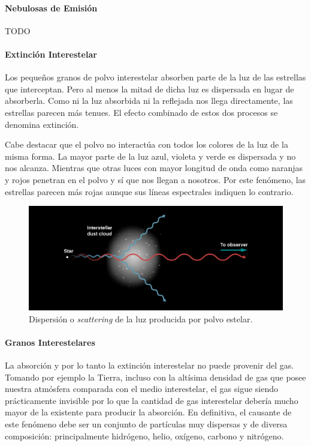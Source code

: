 \documentclass{tufte-handout}
\begin{document}
\paragraph{Nebulosas de Emisión}

TODO

\paragraph{Extinción Interestelar}

Los pequeños granos de polvo interestelar absorben parte de la luz de las estrellas que interceptan. Pero al menos la mitad de dicha luz es dispersada en lugar de absorberla. Como ni la luz absorbida ni la reflejada nos llega directamente, las estrellas parecen más tenues. El efecto combinado de estos dos procesos se denomina extinción.

Cabe destacar que el polvo no interactúa con todos los colores de la luz de la misma forma. La mayor parte de la luz azul, violeta y verde es dispersada y no nos alcanza. Mientras que otras luces con mayor longitud de onda como naranjas y rojos penetran en el polvo y sí que nos llegan a nosotros. Por este fenómeno, las estrellas parecen más rojas aunque sus líneas espectrales indiquen lo contrario.

\begin{figure}
  \includegraphics[width=\linewidth]{img/scatter}
  \caption{Dispersión o \emph{scattering} de la luz producida por polvo estelar.}
\end{figure}

\paragraph{Granos Interestelares}

La absorción y por lo tanto la extinción interestelar no puede provenir del gas. Tomando por ejemplo la Tierra, incluso con la altísima densidad de gas que posee nuestra atmósfera comparada con el medio interestelar, el gas sigue siendo prácticamente invisible por lo que la cantidad de gas interestelar debería mucho mayor de la existente para producir la absorción. En definitiva, el causante de este fenómeno debe ser un conjunto de partículas muy dispersas y de diversa composición: principalmente hidrógeno, helio, oxígeno, carbono y nitrógeno.
\end{document}
